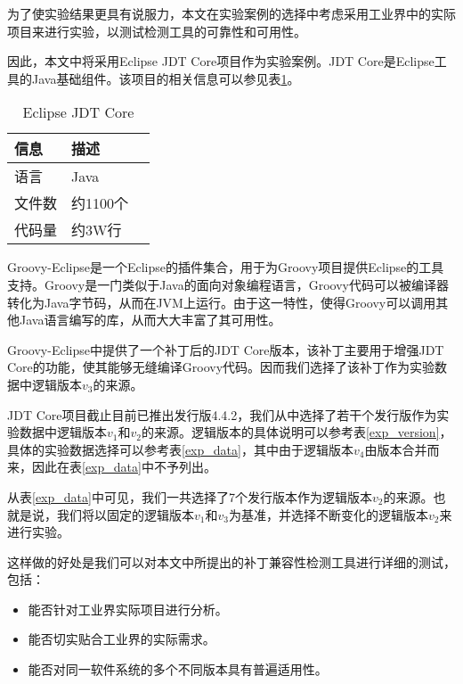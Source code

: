 为了使实验结果更具有说服力，本文在实验案例的选择中考虑采用工业界中的实际项目来进行实验，以测试检测工具的可靠性和可用性。

因此，本文中将采用Eclipse JDT Core项目作为实验案例。JDT Core是Eclipse工具的Java基础组件。该项目的相关信息可以参见表\ref {jdt_core}。

\begin{table}[H]
	\caption{Eclipse JDT Core}
	\label{jdt_core}
	\centering
	\begin{tabular}{llc}
		\toprule[1.5pt]
		{\heiti 信息} & {\heiti 描述} \\\midrule[1pt]
		语言 & Java \\
		文件数 & 约1100个\\
		代码量 & 约3W行\\
		\bottomrule[1.5pt]
	\end{tabular}
\end{table}

Groovy-Eclipse是一个Eclipse的插件集合，用于为Groovy项目提供Eclipse的工具支持。Groovy是一门类似于Java的面向对象编程语言，Groovy代码可以被编译器转化为Java字节码，从而在JVM上运行。由于这一特性，使得Groovy可以调用其他Java语言编写的库，从而大大丰富了其可用性。

Groovy-Eclipse中提供了一个补丁后的JDT Core版本，该补丁主要用于增强JDT Core的功能，使其能够无缝编译Groovy代码。因而我们选择了该补丁作为实验数据中逻辑版本$v_3$的来源。

JDT Core项目截止目前已推出发行版4.4.2，我们从中选择了若干个发行版作为实验数据中逻辑版本$v_1$和$v_2$的来源。逻辑版本的具体说明可以参考表\ref {exp_version}，具体的实验数据选择可以参考表\ref {exp_data}，其中由于逻辑版本$v_4$由版本合并而来，因此在表\ref {exp_data}中不予列出。

从表\ref {exp_data}中可见，我们一共选择了7个发行版本作为逻辑版本$v_2$的来源。也就是说，我们将以固定的逻辑版本$v_1$和$v_3$为基准，并选择不断变化的逻辑版本$v_2$来进行实验。

这样做的好处是我们可以对本文中所提出的补丁兼容性检测工具进行详细的测试，包括：
\begin{itemize}
	\item 能否针对工业界实际项目进行分析。
	\item 能否切实贴合工业界的实际需求。
	\item 能否对同一软件系统的多个不同版本具有普遍适用性。
\end{itemize}

